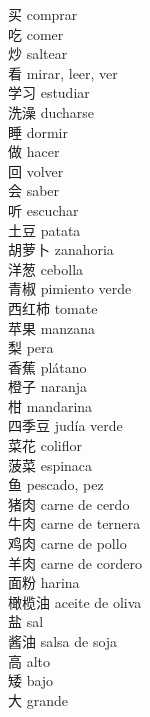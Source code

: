 \documentclass[13pt]{article}
\begin{document}

\begin{CJK*}{UTF8}{gkai}
\begin{multicols}{2}
\begin{pinyinscope}
\LARGE
\noindent
买 \quad comprar\\
吃 \quad comer\\
炒 \quad saltear\\
看 \quad mirar, leer, ver\\
学习 \quad estudiar\\
洗澡 \quad ducharse\\
睡 \quad dormir\\
做 \quad hacer\\
回 \quad volver\\
会 \quad saber\\
听 \quad escuchar\\
土豆 \quad patata\\
胡萝卜 \quad zanahoria\\
洋葱 \quad cebolla\\
青椒 \quad pimiento verde\\
西红柿 \quad tomate\\
苹果 \quad manzana\\
梨 \quad pera\\
香蕉 \quad plátano\\
橙子 \quad naranja\\
柑 \quad mandarina\\
四季豆 \quad judía verde\\
菜花 \quad coliflor\\
菠菜 \quad espinaca\\
鱼 \quad pescado, pez\\
猪肉 \quad carne de cerdo\\
牛肉 \quad carne de ternera\\
鸡肉 \quad carne de pollo\\
羊肉 \quad carne de cordero\\
面粉 \quad harina\\
橄榄油 \quad aceite de oliva\\
盐 \quad sal\\
酱油 \quad salsa de soja\\
高 \quad alto\\
矮 \quad bajo\\
大 \quad grande\\

\end{pinyinscope}
\end{multicols}
\end{CJK*}
\end{document}
